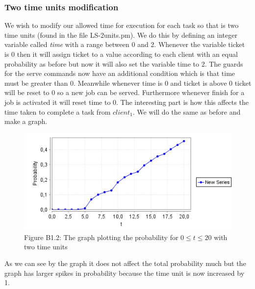 \documentclass[12pt]{report}
\begin{document}
\subsubsection*{Two time units modification}
We wish to modify our allowed time for execution for each task so that is two time units (found in the file LS-2units.pm). We do this by defining an integer variable called \emph{time} with a range between 0 and 2. Whenever the variable ticket is 0 then it will assign ticket to a value according to each client with an equal probability as before but now it will also set the variable time to 2. The guards for the serve commands now have an additional condition which is that time must be greater than 0. Meanwhile whenever time is 0 and ticket is above 0 ticket will be reset to 0 so a new job can be served. Furthermore whenever finish for a job is activated it will reset time to 0. The interesting part is how this affects the time taken to complete a task from $client_1$. We will do the same as before and make a graph.\\
\begin{figure}[H]
	\centering
	\includegraphics[scale=0.75]{../GFX/B1-1e.png}\\
	Figure B1.2: The graph plotting the probability for $0 \leq t \leq 20$ with two time units
\end{figure}
As we can see by the graph it does not affect the total probability much but the graph has larger spikes in probability because the time unit is now increased by 1.
\end{document}
